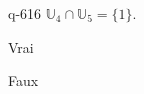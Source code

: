 \begin{truefalse}{q-616}
$\mathbb U_4 \cap  \mathbb U_5=\{1\}$.
\item* Vrai
\item Faux
\end{truefalse}

